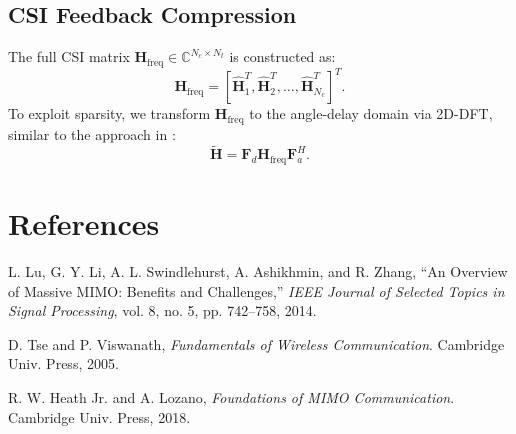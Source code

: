 \documentclass[10pt]{article}
\begin{document}
\subsection{CSI Feedback Compression}
The full CSI matrix \(\mathbf{H}_{\text{freq}} \in \mathbb{C}^{N_c \times N_t}\) is constructed as:
\begin{equation}
\mathbf{H}_{\text{freq}} = \left[\hat{\mathbf{H}}_1^T, \hat{\mathbf{H}}_2^T, \dots, \hat{\mathbf{H}}_{N_c}^T\right]^T.
\end{equation}
To exploit sparsity, we transform \(\mathbf{H}_{\text{freq}}\) to the angle-delay domain via 2D-DFT, similar to the approach in \cite{abc}:
\begin{equation}
\tilde{\mathbf{H}} = \mathbf{F}_d \mathbf{H}_{\text{freq}} \mathbf{F}_a^H.
\end{equation}

\section{References}
\label{sec:references}

\begin{thebibliography}{9}
L. Lu, G. Y. Li, A. L. Swindlehurst, A. Ashikhmin, and R. Zhang, ``An Overview of Massive MIMO: Benefits and Challenges,'' \textit{IEEE Journal of Selected Topics in Signal Processing}, vol. 8, no. 5, pp. 742–758, 2014.

D. Tse and P. Viswanath, \textit{Fundamentals of Wireless Communication}. Cambridge Univ. Press, 2005.

R. W. Heath Jr. and A. Lozano, \textit{Foundations of MIMO Communication}. Cambridge Univ. Press, 2018.
\end{thebibliography}
\end{document}
